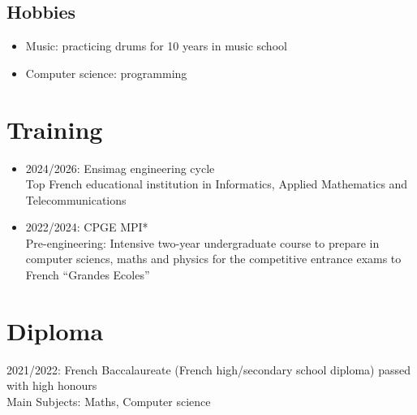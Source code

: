 \documentclass[11pt,oneside,a4paper,titlepage]{article}
\begin{document}
\begin{tcolorbox}
\begin{minipage}[t]{8cm}
\begin{tcolorbox}[grow to left by=0.6cm,colback=gray!25,colframe=white]
      \section*{Hobbies}
      \begin{itemize}
        \item{Music: practicing drums for 10 years in music school}
        \item{Computer science: programming}
      \end{itemize}
    \end{tcolorbox}
  \end{minipage}
  \begin{minipage}[t]{10.6cm}
    \vspace*{-0.5cm}
    \begin{tcolorbox}[grow to right by=0.75cm,colframe=white,colback=white]
      \section*{Training}
      \begin{itemize}
        \item{2024/2026: Ensimag engineering cycle\\Top French educational institution in Informatics, Applied Mathematics and Telecommunications}
        \item{2022/2024: CPGE MPI*\\Pre-engineering: Intensive two-year undergraduate course to prepare in computer sciencs, maths and physics for the competitive entrance exams to French “Grandes Ecoles”
        }
      \end{itemize}

      \section*{Diploma}
      2021/2022: French Baccalaureate (French high/secondary school diploma) passed with high honours\\Main Subjects: Maths, Computer science


\end{tcolorbox}
\end{minipage}
\end{tcolorbox}
\end{document}
